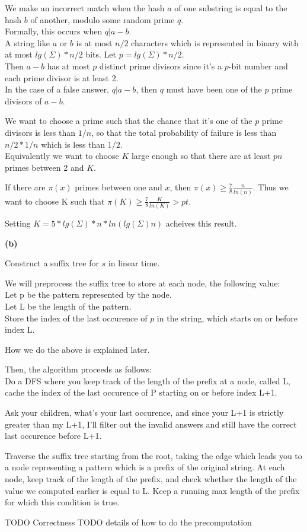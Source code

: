 \documentclass[11pt]{article}
\renewcommand{\part}[1] {\vspace{.10in} {\bf (#1)}}
\begin{document}
We make an incorrect match when the hash $a$ of one substring is equal to the hash $b$ of another, modulo some random prime $q$.\\
Formally, this occurs when $q | a-b$.\\
A string like $a$ or $b$ is at most $n/2$ characters which is represented in binary with at most $lg(\Sigma)* n/2$ bits. Let $p=lg(\Sigma) * n/2$.\\

Then $a-b$ has at most $p$ distinct prime divisors since it's a $p$-bit number and each prime divisor is at least 2.\\
In the case of a false answer, $q | a-b$, then $q$ must have been one of the $p$ prime divisors of $a-b$.

We want to choose a prime such that the chance that it's one of the $p$ prime divisors is less than $1/n$, so that the total probability of failure is less than $n/2 * 1/n$ which is less than $1/2$.\\
Equivalently we want to choose $K$ large enough so that there are at least $pn$ primes between 2 and $K$.

If there are $\pi(x)$ primes between one and $x$, then $\pi(x) \geq \frac{7}{8} \frac{n}{ln(n)}$.
Thus we want to choose K such that
$\pi(K) \geq \frac{7}{8} \frac{K}{ln(K)} > pt$.

Setting $K = 5*lg(\Sigma)*n*ln(lg(\Sigma)n)$ acheives this result.


\part{b}

Construct a suffix tree for $s$ in linear time.

We will preprocess the suffix tree to store at each node, the following value:\\
Let p be the pattern represented by the node.\\
Let L be the length of the pattern.\\
Store the index of the last occurence of $p$ in the string, which starts on or before index L.

How we do the above is explained later.

Then, the algorithm proceeds as follows:\\



Do a DFS where you keep track of the length of the prefix at a node, called L,
cache the index of the last occurence of P starting on or before index L+1.

Ask your children, what's your last occurence, and since your L+1 is strictly greater than my L+1, I'll filter out the invalid answers and still have the correct last occurence before L+1.

Traverse the suffix tree starting from the root, taking the edge which leads you to a node representing a pattern which is a prefix of the original string.
At each node, keep track of the length of the prefix, and check whether the length of the value we computed earlier is equal to L.
Keep a running max length of the prefix for which this condition is true.


TODO Correctness
TODO details of how to do the precomputation
\end{document}
